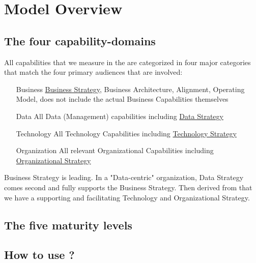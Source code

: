\section{Model Overview}\label{sec:model-overview}

\subsection{The four capability-domains}\label{subsec:the-four-capability-domains}

All capabilities that we measure in the  are categorized in four major categories that match the four primary audiences that are involved:

\begin{enumerate}[leftmargin=1in,font=\bfseries]
    \item [Business]     \ul{Business Strategy}, Business Architecture, Alignment, Operating Model, does not include the actual Business Capabilities themselves
    \item [Data]         All Data (Management) capabilities including \ul{Data Strategy}
    \item [Technology]   All Technology Capabilities including \ul{Technology Strategy}
    \item [Organization] All relevant Organizational Capabilities including \ul{Organizational Strategy}
\end{enumerate}

Business Strategy is leading.
In a "Data-centric" organization, Data Strategy comes second and fully supports the Business Strategy.
Then derived from that we have a supporting and facilitating Technology and Organizational Strategy.

\subsection{The five maturity levels}\label{subsec:the-five-maturity-levels}





\subsection{How to use ?}





